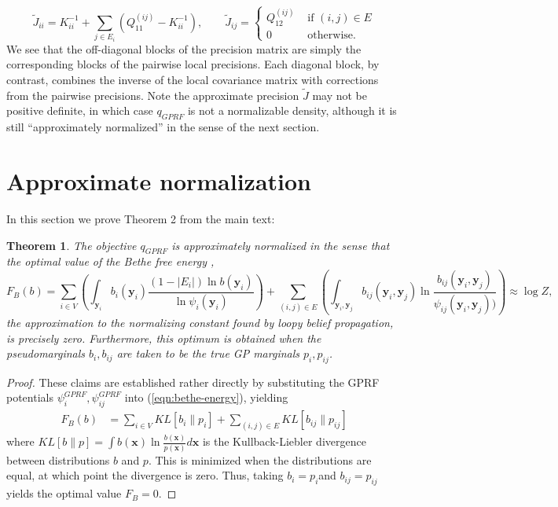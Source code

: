 \documentclass{article}
\newtheorem{theorem}{Theorem}
\renewcommand{\v}[1]{\mathbf{#1}}
\begin{document}
\begin{equation}
\tilde{J}_{ii} = K_{ii}^{-1} + \sum_{j\in E_i} \left(Q^{(ij)}_{11}
    - K_{ii}^{-1}\right), \qquad \tilde{J}_{ij} =
  \left\{\begin{array}{ll}Q^{(ij)}_{12} & \text{ if } (i,j) \in E\\0
    & \text{ otherwise.}\end{array}\right.\label{eqn:approx-precision}
\end{equation}
We see that the off-diagonal blocks of the precision matrix are simply
the corresponding blocks of the pairwise local precisions. Each
diagonal block, by contrast, combines the inverse of the local
covariance matrix with corrections from the pairwise
precisions. Note the approximate precision $\tilde{J}$ may not be positive
definite, in which case $q_{GPRF}$ is not a normalizable density,
although it is still ``approximately normalized'' in the sense of the next section. 

\section{Approximate normalization}
\label{sec:approx-norm}

In this section we prove Theorem 2 from the main text:

\begin{theorem}
The objective $q_{GPRF}$ is approximately normalized in the sense that
the optimal value of the {\em Bethe free energy} \cite{yedidia2001bethe}, 
\begin{equation}
F_B(b) = \sum_{i\in V} \left(\int_{\v{y}_i} b_i(\v{y}_i) \frac{(1-|E_i|)\ln
    b(\v{y}_i)}{\ln \psi_i(\v{y}_i)}\right)  + \sum_{(i,j)\in E} \left(\int_{\v{y}_i, \v{y}_j} b_{ij}(\v{y}_i,
  \v{y}_j) \ln \frac{b_{ij}(\v{y}_i,
  \v{y}_j)}{\psi_{ij}(\v{y}_i, \v{y}_j))}\right)
\label{eqn:bethe-energy} \approx \log Z,
\end{equation}
the approximation to the normalizing constant found by loopy belief
propagation, is precisely zero. Furthermore, this
optimum is obtained when the pseudomarginals $b_i, b_{ij}$ are
taken to be the true GP marginals $p_i, p_{ij}$. 
\end{theorem}
\begin{proof}
These claims are established rather directly by substituting the GPRF potentials
$\psi_i^{GPRF}, \psi_{ij}^{GPRF}$ into (\ref{eqn:bethe-energy}), yielding
\begin{align}
F_B(b)&= \sum_{i\in V} KL[b_i \| p_i] + \sum_{(i,j)\in E} KL[b_{ij}\| p_{ij}]
\end{align}
where $KL[b\|p] = \int b(\v{x}) \ln \frac{b(\v{x})}{p(\v{x})}d\v{x}$
is the Kullback-Liebler divergence between distributions $b$ and
$p$.  This is minimized when the distributions are equal, at which
point the divergence is zero. Thus, taking $b_i=p_i$and
$b_{ij}=p_{ij}$ yields the optimal value $F_B=0$.
\end{proof}
\end{document}

